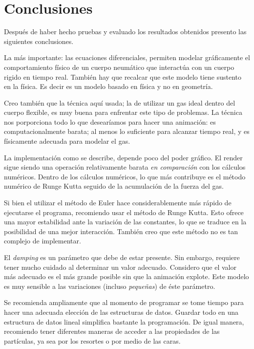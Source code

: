 \chapter*{Conclusiones}

Después de haber hecho pruebas y evaluado los resultados obtenidos presento las siguientes conclusiones.

La más importante: las ecuaciones diferenciales, permiten modelar gráficamente el comportamiento físico de un cuerpo neumático que interactúa con un cuerpo rigido en tiempo real.
También hay que recalcar que este modelo tiene sustento en la física. 
Es decir es un modelo basado en física y no en geometría.

Creo también que la técnica aquí usada; la de utilizar un gas ideal dentro del cuerpo flexible, es muy buena para enfrentar este tipo de problemas.
La técnica nos porporciona todo lo que desearíamos para hacer una animación: es computacionalmente barata; al menos lo suficiente para alcanzar tiempo real, y es físicamente adecuada para modelar el gas.

La implementación como se describe, depende poco del poder gráfico.
El render sigue siendo una operación relativamente barata \emph{en comparación} con los cálculos numéricos.
Dentro de los cálculos numéricos, lo que más contribuye es el método numérico de Runge Kutta seguido de la acumulación de la fuerza del gas.

Si bien el utilizar el método de Euler hace considerablemente más rápido de ejecutarse el programa, recomiendo usar el método de Runge Kutta.
Esto ofrece una mayor estabilidad ante la variación de las constantes, lo que se traduce en la posibilidad de una mejor interacción.
También creo que este método no es tan complejo de implementar.

El \emph{\textenglish{damping}} es un parámetro que debe de estar presente. 
Sin embargo, requiere tener mucho cuidado al determinar un valor adecuado.
Considero que el valor más adecuado es el más grande posible sin que la animación explote.
Este modelo es muy sensible a las variaciones (incluso \emph{pequeñas}) de éste parámetro.

Se recomienda ampliamente que al momento de programar se tome tiempo para hacer una adecuada elección de las estructuras de datos.
Guardar todo en una estructura de datos lineal simplifica bastante la programación.
De igual manera, recomiendo tener diferentes maneras de acceder a las propiedades de las partículas, ya sea por los resortes o por medio de las caras.

